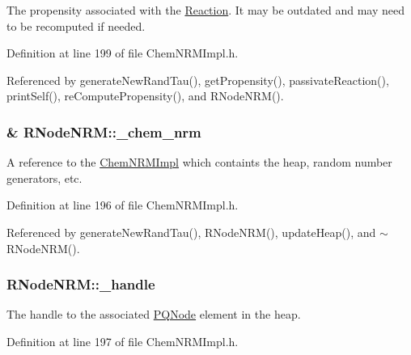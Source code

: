 The propensity associated with the \hyperlink{classReaction}{Reaction}. It may be outdated and may need to be recomputed if needed. 



Definition at line 199 of file Chem\+N\+R\+M\+Impl.\+h.



Referenced by generate\+New\+Rand\+Tau(), get\+Propensity(), passivate\+Reaction(), print\+Self(), re\+Compute\+Propensity(), and R\+Node\+N\+R\+M().

\hypertarget{classRNodeNRM_ae7a8eb17ab2dc835ac90adc54027f96f}{
\subsubsection[{\+\_\+chem\+\_\+nrm}]{\& R\+Node\+N\+R\+M\+::\+\_\+chem\+\_\+nrm\hspace{0.3cm}{\ttfamily [private]}}}\label{classRNodeNRM_ae7a8eb17ab2dc835ac90adc54027f96f}


A reference to the \hyperlink{classChemNRMImpl}{Chem\+N\+R\+M\+Impl} which containts the heap, random number generators, etc. 



Definition at line 196 of file Chem\+N\+R\+M\+Impl.\+h.



Referenced by generate\+New\+Rand\+Tau(), R\+Node\+N\+R\+M(), update\+Heap(), and $\sim$\+R\+Node\+N\+R\+M().

\hypertarget{classRNodeNRM_a8330d3bffc447a421484615c84ab080b}{
\subsubsection[{\+\_\+handle}]{ R\+Node\+N\+R\+M\+::\+\_\+handle\hspace{0.3cm}{\ttfamily [private]}}}\label{classRNodeNRM_a8330d3bffc447a421484615c84ab080b}


The handle to the associated \hyperlink{classPQNode}{P\+Q\+Node} element in the heap. 



Definition at line 197 of file Chem\+N\+R\+M\+Impl.\+h.



